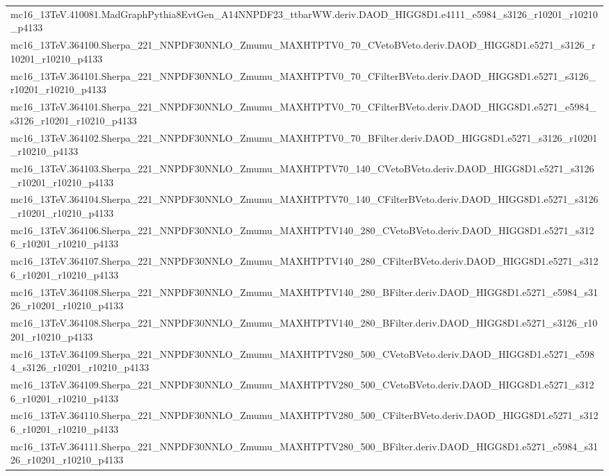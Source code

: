 \begin{adjustwidth}{-3em}{-3em}
\begin{longtable}{l}
mc16\_13TeV.410081.MadGraphPythia8EvtGen\_A14NNPDF23\_ttbarWW.deriv.DAOD\_HIGG8D1.e4111\_e5984\_s3126\_r10201\_r10210\_p4133 \\
mc16\_13TeV.364100.Sherpa\_221\_NNPDF30NNLO\_Zmumu\_MAXHTPTV0\_70\_CVetoBVeto.deriv.DAOD\_HIGG8D1.e5271\_s3126\_r10201\_r10210\_p4133 \\
mc16\_13TeV.364101.Sherpa\_221\_NNPDF30NNLO\_Zmumu\_MAXHTPTV0\_70\_CFilterBVeto.deriv.DAOD\_HIGG8D1.e5271\_s3126\_r10201\_r10210\_p4133 \\
mc16\_13TeV.364101.Sherpa\_221\_NNPDF30NNLO\_Zmumu\_MAXHTPTV0\_70\_CFilterBVeto.deriv.DAOD\_HIGG8D1.e5271\_e5984\_s3126\_r10201\_r10210\_p4133 \\
mc16\_13TeV.364102.Sherpa\_221\_NNPDF30NNLO\_Zmumu\_MAXHTPTV0\_70\_BFilter.deriv.DAOD\_HIGG8D1.e5271\_s3126\_r10201\_r10210\_p4133 \\
mc16\_13TeV.364103.Sherpa\_221\_NNPDF30NNLO\_Zmumu\_MAXHTPTV70\_140\_CVetoBVeto.deriv.DAOD\_HIGG8D1.e5271\_s3126\_r10201\_r10210\_p4133 \\
mc16\_13TeV.364104.Sherpa\_221\_NNPDF30NNLO\_Zmumu\_MAXHTPTV70\_140\_CFilterBVeto.deriv.DAOD\_HIGG8D1.e5271\_s3126\_r10201\_r10210\_p4133 \\
mc16\_13TeV.364106.Sherpa\_221\_NNPDF30NNLO\_Zmumu\_MAXHTPTV140\_280\_CVetoBVeto.deriv.DAOD\_HIGG8D1.e5271\_s3126\_r10201\_r10210\_p4133 \\
mc16\_13TeV.364107.Sherpa\_221\_NNPDF30NNLO\_Zmumu\_MAXHTPTV140\_280\_CFilterBVeto.deriv.DAOD\_HIGG8D1.e5271\_s3126\_r10201\_r10210\_p4133 \\
mc16\_13TeV.364108.Sherpa\_221\_NNPDF30NNLO\_Zmumu\_MAXHTPTV140\_280\_BFilter.deriv.DAOD\_HIGG8D1.e5271\_e5984\_s3126\_r10201\_r10210\_p4133 \\
mc16\_13TeV.364108.Sherpa\_221\_NNPDF30NNLO\_Zmumu\_MAXHTPTV140\_280\_BFilter.deriv.DAOD\_HIGG8D1.e5271\_s3126\_r10201\_r10210\_p4133 \\
mc16\_13TeV.364109.Sherpa\_221\_NNPDF30NNLO\_Zmumu\_MAXHTPTV280\_500\_CVetoBVeto.deriv.DAOD\_HIGG8D1.e5271\_e5984\_s3126\_r10201\_r10210\_p4133 \\
mc16\_13TeV.364109.Sherpa\_221\_NNPDF30NNLO\_Zmumu\_MAXHTPTV280\_500\_CVetoBVeto.deriv.DAOD\_HIGG8D1.e5271\_s3126\_r10201\_r10210\_p4133 \\
mc16\_13TeV.364110.Sherpa\_221\_NNPDF30NNLO\_Zmumu\_MAXHTPTV280\_500\_CFilterBVeto.deriv.DAOD\_HIGG8D1.e5271\_s3126\_r10201\_r10210\_p4133 \\
mc16\_13TeV.364111.Sherpa\_221\_NNPDF30NNLO\_Zmumu\_MAXHTPTV280\_500\_BFilter.deriv.DAOD\_HIGG8D1.e5271\_e5984\_s3126\_r10201\_r10210\_p4133 \\

\end{longtable}
\end{adjustwidth}

